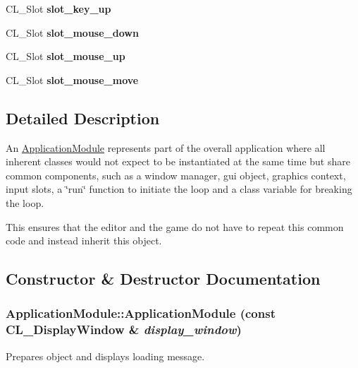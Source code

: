 \begin{DoxyCompactItemize}
\item 
\hypertarget{classApplicationModule_a7982a5f4dc5cc214a68646a545df3ea9}{
CL\_\-Slot {\bfseries slot\_\-key\_\-up}}
\label{classApplicationModule_a7982a5f4dc5cc214a68646a545df3ea9}

\item 
\hypertarget{classApplicationModule_aed41a09f76c702164b8f8ebdae86f830}{
CL\_\-Slot {\bfseries slot\_\-mouse\_\-down}}
\label{classApplicationModule_aed41a09f76c702164b8f8ebdae86f830}

\item 
\hypertarget{classApplicationModule_a716f59e33bd1c6b2ec0705428b7b280f}{
CL\_\-Slot {\bfseries slot\_\-mouse\_\-up}}
\label{classApplicationModule_a716f59e33bd1c6b2ec0705428b7b280f}

\item 
\hypertarget{classApplicationModule_abea0d9e41cec16a012776ceb78dd9348}{
CL\_\-Slot {\bfseries slot\_\-mouse\_\-move}}
\label{classApplicationModule_abea0d9e41cec16a012776ceb78dd9348}

\end{DoxyCompactItemize}


\subsection{Detailed Description}
An \hyperlink{classApplicationModule}{ApplicationModule} represents part of the overall application where all inherent classes would not expect to be instantiated at the same time but share common components, such as a window manager, gui object, graphics context, input slots, a \char`\"{}run\char`\"{} function to initiate the loop and a class variable for breaking the loop.

This ensures that the editor and the game do not have to repeat this common code and instead inherit this object. 

\subsection{Constructor \& Destructor Documentation}
\hypertarget{classApplicationModule_adee14a760314582348ee3205097fea4c}{
\subsubsection[{ApplicationModule}]{\setlength{\rightskip}{0pt plus 5cm}ApplicationModule::ApplicationModule (const CL\_\-DisplayWindow \& {\em display\_\-window})}}
\label{classApplicationModule_adee14a760314582348ee3205097fea4c}
Prepares object and displays loading message. 

